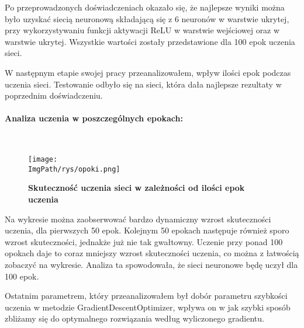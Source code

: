 \documentclass[a4paper,12pt,twoside,openany]{report}
\newcommand{\ImgPath}{.}
\begin{document}
	Po przeprowadzonych doświadczeniach okazało się, że najlepsze wyniki można było uzyskać siecią neuronową składającą się z 6 neuronów w warstwie ukrytej, przy wykorzystywaniu funkcji aktywacji ReLU w warstwie wejściowej oraz w warstwie ukrytej. Wszystkie wartości zostały przedstawione dla 100 epok uczenia sieci.
	
	W następnym etapie swojej pracy przeanalizowałem, wpływ ilości epok podczas uczenia sieci. Testowanie odbyło się na sieci, która dała najlepsze rezultaty w poprzednim doświadczeniu.
	\paragraph{Analiza uczenia w poszczególnych epokach:}
	\mbox{}\\
	
	\begin{figure}[H]
		\centering
		{\label{fig:b}\texttt{[image: \\ImgPath/rys/opoki.png]}}
		\caption{  \textbf{Skuteczność uczenia sieci w zależności od ilości epok uczenia}}
	\end{figure}

	Na wykresie można zaobserwować bardzo dynamiczny wzrost skuteczności uczenia, dla pierwszych 50 epok. Kolejnym 50 epokach następuje również sporo wzrost skuteczności, jednakże już nie tak gwałtowny. Uczenie przy ponad 100 opokach daje to coraz mniejszy wzrost skuteczności uczenia, co można z łatwością zobaczyć na wykresie. Analiza ta spowodowała, że sieci neuronowe będę uczył dla 100 epok.
	
	Ostatnim parametrem, który przeanalizowałem był dobór parametru szybkości uczenia w metodzie GradientDescentOptimizer, wpływa on w jak szybki sposób zbliżamy się do optymalnego rozwiązania według wyliczonego gradientu.
	
\end{document}
